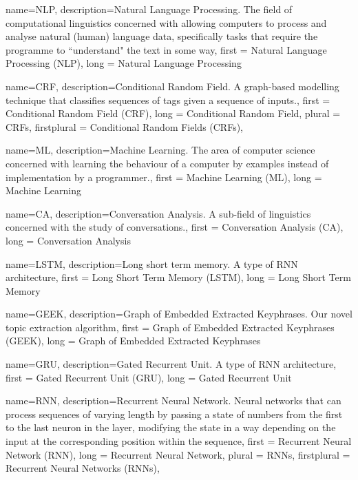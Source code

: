 \makeglossaries
{}


{
        name=NLP,
        description={Natural Language Processing. The field of computational linguistics concerned with allowing computers to process and analyse natural (human) language data, specifically tasks that require the programme to ``understand" the text in some way},
        first = {Natural Language Processing (NLP)},
        long = {Natural Language Processing}
}

{
        name=CRF,
        description={Conditional Random Field. A graph-based modelling technique that classifies sequences of tags given a sequence of inputs.},
        first = {Conditional Random Field (CRF)},
        long = {Conditional Random Field},
        plural = {CRFs},
        firstplural = {Conditional Random Fields (CRFs)},
}

{
        name=ML,
        description={Machine Learning. The area of computer science concerned with learning the behaviour of a computer by examples instead of implementation by a programmer.},
        first = {Machine Learning (ML)},
        long = {Machine Learning}
}

{
        name=CA,
        description={Conversation Analysis. A sub-field of linguistics concerned with the study of conversations.},
        first = {Conversation Analysis (CA)},
        long = {Conversation Analysis}
}

{
        name=LSTM,
        description={Long short term memory. A type of RNN architecture},
        first = {Long Short Term Memory (LSTM)},
        long = {Long Short Term Memory}
}

{
        name=GEEK,
        description={Graph of Embedded Extracted Keyphrases. Our novel topic extraction algorithm},
        first = {Graph of Embedded Extracted Keyphrases (GEEK)},
        long = {Graph of Embedded Extracted Keyphrases}
}

{
        name=GRU,
        description={Gated Recurrent Unit. A type of RNN architecture},
        first = {Gated Recurrent Unit (GRU)},
        long = {Gated Recurrent Unit}
}


{
        name=RNN,
        description={Recurrent Neural Network. Neural networks that can process sequences of varying length by passing a state of numbers from the first to the last neuron in the layer, modifying the state in a way depending on the input at the corresponding position within the sequence},
        first = {Recurrent Neural Network (RNN)},
        long = {Recurrent Neural Network},
        plural = {RNNs},
        firstplural = {Recurrent Neural Networks (RNNs)},
}

